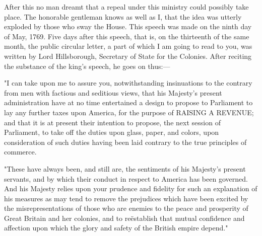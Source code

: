 After this no man dreamt that a repeal under this ministry could possibly take place. The honorable gentleman knows as well as I, that the idea was utterly exploded by those who sway the House. This speech was made on the ninth day of May, 1769. Five days after this speech, that is, on the thirteenth of the same month, the public circular letter, a part of which I am going to read to you, was written by Lord Hillsborough, Secretary of State for the Colonies. After reciting the substance of the king's speech, he goes on thus:—

"I can take upon me to assure you, notwithstanding insinuations to the contrary from men with factious and seditious views, that his Majesty's present administration have at no time entertained a design to propose to Parliament to lay any further taxes upon America, for the purpose of RAISING A REVENUE; and that it is at present their intention to propose, the next session of Parliament, to take off the duties upon glass, paper, and colors, upon consideration of such duties having been laid contrary to the true principles of commerce.

"These have always been, and still are, the sentiments of his Majesty's present servants, and by which their conduct in respect to America has been governed. And his Majesty relies upon your prudence and fidelity for such an explanation of his measures as may tend to remove the prejudices which have been excited by the misrepresentations of those who are enemies to the peace and prosperity of Great Britain and her colonies, and to reëstablish that mutual confidence and affection upon which the glory and safety of the British empire depend."

